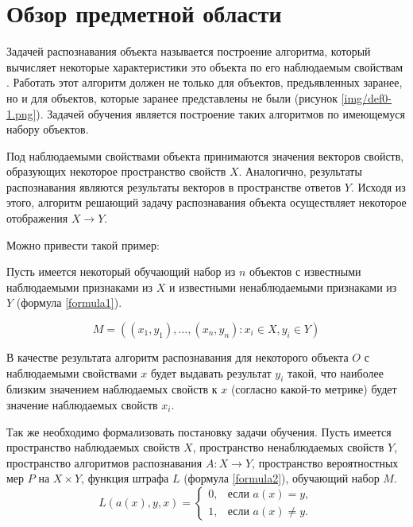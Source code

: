 \chapter{Обзор предметной области}
Задачей распознавания объекта называется построение алгоритма, который вычисляет некоторые характеристики это объекта по его наблюдаемым свойствам \cite{Merkov}. Работать этот алгоритм должен не только для объектов, предьявленных заранее, но и для объектов, которые заранее представлены не были (рисунок \ref{img/def0-1.png}). Задачей обучения является построение таких алгоритмов по имеющемуся набору объектов.


Под наблюдаемыми свойствами объекта принимаются значения векторов свойств, образующих некоторое пространство свойств $X$. Аналогично, результаты распознавания являются результаты векторов в пространстве ответов $Y$. Исходя из этого, алгоритм решающий задачу распознавания объекта осуществляет некоторое отображения $X \rightarrow Y$.

Можно привести такой пример:

Пусть имеется некоторый обучающий набор из $n$ объектов с известными наблюдаемыми признаками из $X$ и известными ненаблюдаемыми признаками из $Y$ (формула \ref{formula1}).

\begin{equation}
M = ((x_1, y_1), ... , (x_n, y_n) : x_i \in X, y_i \in Y)
\label{formula1}
\end{equation}

В качестве результата алгоритм распознавания для некоторого объекта $O$ с наблюдаемыми свойствами $x$ будет выдавать результат $y_i$ такой, что наиболее близким значением наблюдаемых свойств к $x$ (согласно какой-то метрике) будет значение наблюдаемых свойств $x_i$. 

Так же необходимо формализовать постановку задачи обучения. Пусть имеется пространство наблюдаемых свойств $X$, пространство ненаблюдаемых свойств $Y$, пространство алгоритмов распознавания $A: X \rightarrow Y$, пространство вероятностных мер $P$ на $X \times Y$, функция штрафа $L$ (формула \ref{formula2}), обучающий набор $M$. 
\begin{equation}
L(a(x), y, x) =
\begin{cases}
0, & \text{если } a(x) = y, \\
1, & \text{если } a(x) \neq y.
\end{cases}
\label{formula2}
\end{equation}

